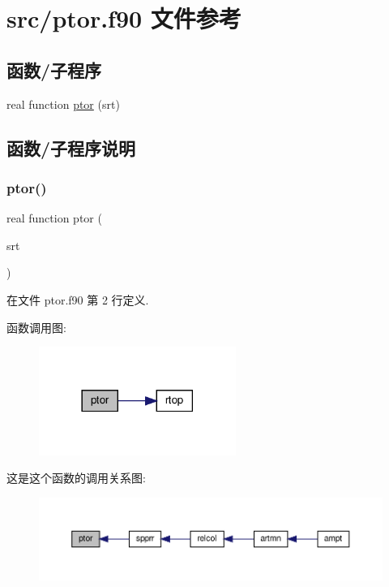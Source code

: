\hypertarget{ptor_8f90}{}\section{src/ptor.f90 文件参考}
\label{ptor_8f90}
\subsection*{函数/子程序}
\begin{DoxyCompactItemize}
\item 
real function \mbox{\hyperlink{ptor_8f90_add4abe4f93ae3ba99dd2f3484c0ee876}{ptor}} (srt)
\end{DoxyCompactItemize}


\subsection{函数/子程序说明}
\mbox{\label{ptor_8f90_add4abe4f93ae3ba99dd2f3484c0ee876}} 
\subsubsection{\texorpdfstring{ptor()}{ptor()}}
{\footnotesize\ttfamily real function ptor (\begin{DoxyParamCaption}\item[{}]{srt }\end{DoxyParamCaption})}



在文件 ptor.\+f90 第 2 行定义.

函数调用图\+:
\nopagebreak
\begin{figure}[H]
\begin{center}
\leavevmode
\includegraphics[width=182pt]{ptor_8f90_add4abe4f93ae3ba99dd2f3484c0ee876_cgraph}
\end{center}
\end{figure}
这是这个函数的调用关系图\+:
\nopagebreak
\begin{figure}[H]
\begin{center}
\leavevmode
\includegraphics[width=350pt]{ptor_8f90_add4abe4f93ae3ba99dd2f3484c0ee876_icgraph}
\end{center}
\end{figure}
